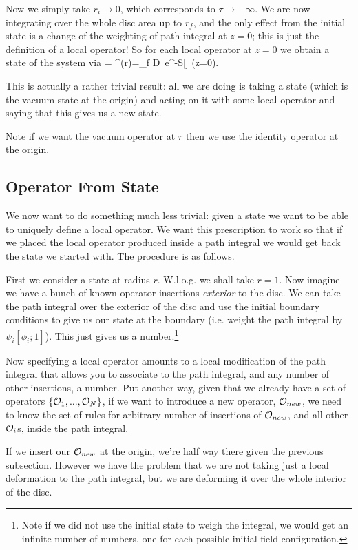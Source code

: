 Now we simply take $r_i\to 0$, which corresponds to $\tau \to -\infty$. We are now integrating over the whole disc area up to $r_f$, and the only effect from the initial state is a change of the weighting of path integral at $z=0$; this is just the definition of a local operator! So for each local operator at $z=0$ we obtain a state of the system via 
\bse 
    \psi[\phi_f;r] = \int^{\phi(r)=\phi_f} D\phi \, e^{-S[\phi]} \cO(z=0).
\ese 

This is actually a rather trivial result: all we are doing is taking a state (which is the vacuum state at the origin) and acting on it with some local operator and saying that this gives us a new state. 

\br 
    Note if we want the vacuum operator at $r$ then we use the identity operator at the origin.
\er 

\subsection{Operator From State}

We now want to do something much less trivial: given a state we want to be able to uniquely define a local operator. We want this prescription to work so that if we placed the local operator produced inside a path integral we would get back the state we started with. The procedure is as follows.

First we consider a state at radius $r$. W.l.o.g. we shall take $r=1$. Now imagine we have a bunch of known operator insertions \textit{exterior} to the disc. We can take the path integral over the exterior of the disc and use the initial boundary conditions to give us our state at the boundary (i.e. weight the path integral by $\psi_i[\phi_i;1]$). This just gives us a number.\footnote{Note if we did not use the initial state to weigh the integral, we would get an infinite number of numbers, one for each possible initial field configuration.}

Now specifying a local operator amounts to a local modification of the path integral that allows you to associate to the path integral, and any number of other insertions, a number. Put another way, given that we already have a set of operators $\{\mathcal{O}_1,...,\mathcal{O}_N\}$, if we want to introduce a new operator, $\mathcal{O}_{new}$, we need to know the set of rules for arbitrary number of insertions of $\mathcal{O}_{new}$, and all other $\mathcal{O}_i$s, inside the path integral. 

If we insert our $\mathcal{O}_{new}$ at the origin, we're half way there given the previous subsection. However we have the problem that we are not taking just a local deformation to the path integral, but we are deforming it over the whole interior of the disc. 

